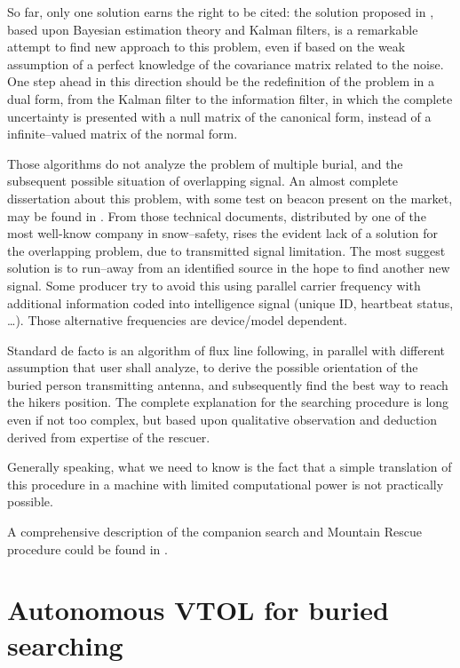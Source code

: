So far, only one solution earns the right to be cited: the solution proposed in \citep{pinies2006fast,pinies2006localization}, based upon Bayesian estimation theory and Kalman filters, is a remarkable attempt to find new approach to this problem, even if based on the weak assumption of a perfect knowledge of the covariance matrix related to the noise. One step ahead in this direction should be the redefinition of the problem in a dual form, from the Kalman filter to the information filter, in which the complete uncertainty is presented with a null matrix of the canonical form, instead of a infinite--valued matrix of the normal form. 

Those algorithms do not analyze the problem of multiple burial, and the subsequent possible situation of overlapping signal. An almost complete dissertation about this problem, with some test on beacon present on the market, may be found in \citep{signaloverlappingARVA1,signaloverlappingARVA2}. From those technical documents, distributed by one of the most well-know company in snow--safety, rises the evident lack of a solution for the overlapping problem, due to transmitted signal limitation. The most suggest solution is to run--away from an identified source in the hope to find another new signal. Some producer try to avoid this using parallel carrier frequency with additional information coded into intelligence signal (unique ID, heartbeat status, \dots). Those alternative frequencies are device/model dependent.

Standard de facto is an algorithm of flux line following, in parallel with different assumption that user shall analyze, to derive the possible orientation of the buried person transmitting antenna, and subsequently find the best way to reach the hikers position. The complete explanation for the searching procedure is long even if not too complex, but based upon qualitative observation and deduction derived from expertise of the rescuer.

Generally speaking, what we need to know is the fact that a simple translation of this procedure in a machine with limited computational power is not practically possible.

A comprehensive description of the companion search and Mountain Rescue procedure could be found in \citep{ManualeSciAlpinismo}.

\section{Autonomous VTOL for buried searching}

